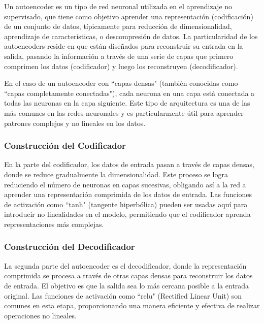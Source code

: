 Un autoencoder es un tipo de red neuronal utilizada en el aprendizaje no supervisado, que tiene como objetivo aprender una representación (codificación) de un conjunto de datos, típicamente para reducción de dimensionalidad, aprendizaje de características, o descompresión de datos. La particularidad de los autoencoders reside en que están diseñados para reconstruir su entrada en la salida, pasando la información a través de una serie de capas que primero comprimen los datos (codificador) y luego los reconstruyen (decodificador).

En el caso de un autoencoder con \textquotedblleft capas densas" (también conocidas como \textquotedblleft capas completamente conectadas"), cada neurona en una capa está conectada a todas las neuronas en la capa siguiente. Este tipo de arquitectura es una de las más comunes en las redes neuronales y es particularmente útil para aprender patrones complejos y no lineales en los datos.

\subsubsection{Construcción del Codificador}
En la parte del codificador, los datos de entrada pasan a través de capas densas, donde se reduce gradualmente la dimensionalidad. Este proceso se logra reduciendo el número de neuronas en capas sucesivas, obligando así a la red a aprender una representación comprimida de los datos de entrada. Las funciones de activación como \textquotedblleft tanh" (tangente hiperbólica) pueden ser usadas aquí para introducir no linealidades en el modelo, permitiendo que el codificador aprenda representaciones más complejas.

\subsubsection{Construcción del Decodificador} 
La segunda parte del autoencoder es el decodificador, donde la representación comprimida se procesa a través de otras capas densas para reconstruir los datos de entrada. El objetivo es que la salida sea lo más cercana posible a la entrada original. Las funciones de activación como \textquotedblleft relu" (Rectified Linear Unit) son comunes en esta etapa, proporcionando una manera eficiente y efectiva de realizar operaciones no lineales.

